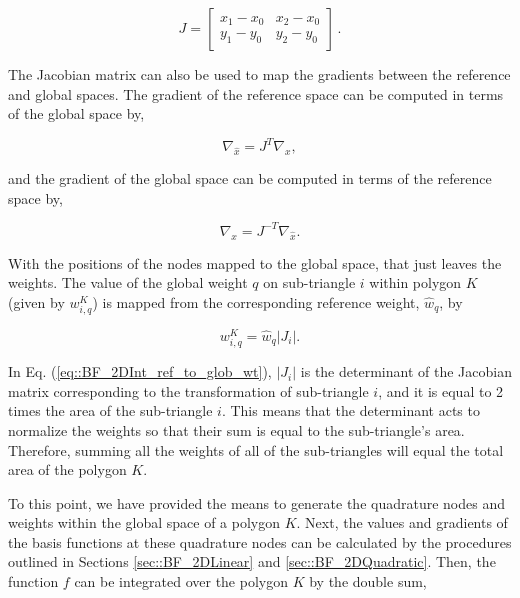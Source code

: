 \begin{equation}
\label{eq::BF_2DInt_jacobian}
 J = \left[
 \begin{array}{cc}
 x_1 - x_0 & x_2 - x_0 \\
 y_1 - y_0  & y_2 - y_0
 \end{array}
 \right] \, .
\end{equation}

\noindent The Jacobian matrix can also be used to map the gradients between the reference and global spaces. The gradient of the reference space can be computed in terms of the global space by,

\begin{equation}
\label{eq::BF_2DInt_grad_ref}
\nabla_{\hat{x}} = J^{T} \nabla_{x}  ,
\end{equation}

\noindent and the gradient of the global space can be computed in terms of the reference space by,

\begin{equation}
\label{eq::BF_2DInt_grad_glob}
\nabla_{x} = J^{-T} \nabla_{\hat{x}}  .
\end{equation}

With the positions of the nodes mapped to the global space, that just leaves the weights. The value of the global weight $q$ on sub-triangle $i$ within polygon $K$ (given by $w_{i,q}^K$) is mapped from the corresponding reference weight, $\hat{w}_q$, by

\begin{equation}
\label{eq::BF_2DInt_ref_to_glob_wt}
w_{i,q}^K =   \hat{w}_q | J_i | .
\end{equation}

\noindent In Eq. (\ref{eq::BF_2DInt_ref_to_glob_wt}), $| J_i |$ is the determinant of the Jacobian matrix corresponding to the transformation of sub-triangle $i$, and it is equal to 2 times the area of the sub-triangle $i$. This means that the determinant acts to normalize the weights so that their sum is equal to the sub-triangle's area. Therefore, summing all the weights of all of the sub-triangles will equal the total area of the polygon $K$.

To this point, we have provided the means to generate the quadrature nodes and weights within the global space of a polygon $K$. Next, the values and gradients of the basis functions at these quadrature nodes can be calculated by the procedures outlined in Sections \ref{sec::BF_2DLinear} and \ref{sec::BF_2DQuadratic}. Then, the function $f$ can be integrated over the polygon $K$ by the double sum,

